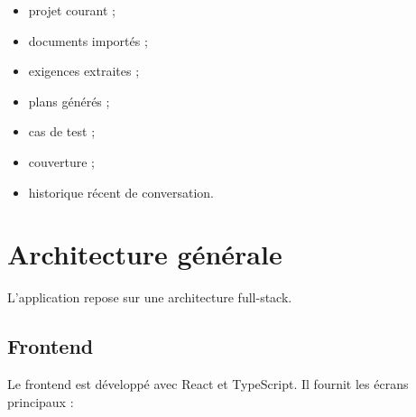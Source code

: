 \documentclass[
  french,
]{report}
\providecommand{\tightlist}{%
  \setlength{\itemsep}{0pt}\setlength{\parskip}{0pt}}
\begin{document}
\begin{itemize}
\tightlist
\item
  projet courant ;
\item
  documents importés ;
\item
  exigences extraites ;
\item
  plans générés ;
\item
  cas de test ;
\item
  couverture ;
\item
  historique récent de conversation.
\end{itemize}

\chapter{Architecture générale}\label{architecture-guxe9nuxe9rale}

L'application repose sur une architecture full-stack.

\begin{center}
\end{center}

\section{Frontend}\label{frontend}

Le frontend est développé avec React et TypeScript. Il fournit les
écrans principaux :
\end{document}
